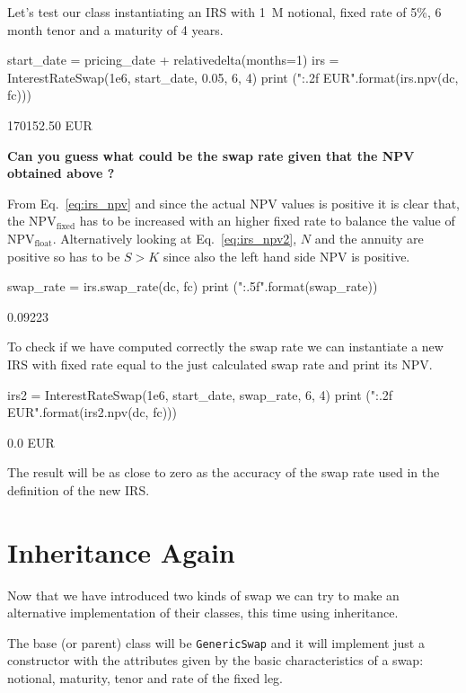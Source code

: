 Let's test our class instantiating an IRS with 1~M notional, fixed rate of 5\%, 6 month tenor and a maturity of 4 years.

\begin{ipython}
start_date = pricing_date + relativedelta(months=1)
irs = InterestRateSwap(1e6, start_date, 0.05, 6, 4)
print ("{:.2f} EUR".format(irs.npv(dc, fc)))
\end{ipython}
\begin{ioutput}
170152.50 EUR
\end{ioutput}

\textbf{Can you guess what could be the \textbf{swap rate} given that the NPV obtained above ?}

From Eq.~\ref{eq:irs_npv} and since the actual NPV values is positive it is clear that, the NPV$_{\textrm{fixed}}$ has to be increased with an higher fixed rate to balance the value of NPV$_{\textrm{float}}$.
Alternatively looking at Eq.~\ref{eq:irs_npv2}, $N$ and the annuity are positive so has to be $S\gt K$ since also the left hand side NPV is positive.  

\begin{ipython}
swap_rate = irs.swap_rate(dc, fc)
print ("{:.5f}".format(swap_rate))
\end{ipython}
\begin{ioutput}
0.09223
\end{ioutput}
    
To check if we have computed correctly the swap rate we can instantiate a new IRS with fixed rate equal to the just calculated swap rate and print its NPV.

\begin{ipython}
irs2 = InterestRateSwap(1e6, start_date, swap_rate, 6, 4)
print ("{:.2f} EUR".format(irs2.npv(dc, fc)))
\end{ipython}
\begin{ioutput}
0.0 EUR
\end{ioutput}
\noindent
The result will be as close to zero as the accuracy of the swap rate used in the definition of the new IRS.
   
\section{Inheritance Again}
\begin{finmarkets}
Now that we have introduced two kinds of swap we can try to make an alternative implementation of their classes, this time using inheritance.

The base (or parent) class will be \texttt{GenericSwap} and it will implement just a constructor with the attributes given by the basic characteristics of a swap: notional, maturity, tenor and rate of the fixed leg.
\end{finmarkets}

